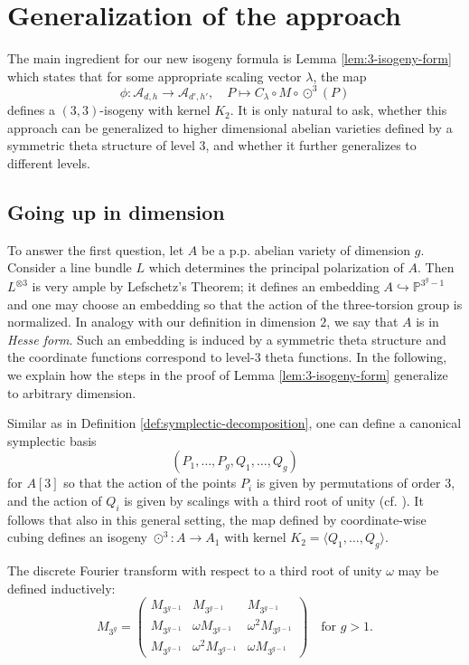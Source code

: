 \documentclass[11pt]{amsart}
\theoremstyle{definition}
\newcommand{\A}{\mathcal{A}}
\newcommand{\PP}{\mathbb{P}}
\newcommand{\cube}{\odot^3}
\begin{document}
\section{Generalization of the approach} \label{sec:generalizations}


The main ingredient for our new isogeny formula is Lemma \ref{lem:3-isogeny-form} which states that for some appropriate scaling vector $\lambda$, the map
\[
\phi: \A_{d,h} \to \A_{d',h'}, \quad P \mapsto C_\lambda \circ M \circ \cube(P)
\] 
defines a $(3,3)$-isogeny with kernel $K_2$. It is only natural to ask, whether this approach can be generalized to higher dimensional abelian varieties defined by a symmetric theta structure of level $3$, and whether it further generalizes to different levels.

\subsection{Going up in dimension}
To answer the first question, let $A$ be a p.p. abelian variety of dimension $g$. Consider a line bundle $L$ which determines the principal polarization of $A$. Then $L^{\otimes 3}$ is very ample by Lefschetz's Theorem; it defines an embedding $A \hookrightarrow \PP^{3^g-1}$ and one may choose an embedding so that the action of the three-torsion group is normalized. In analogy with our definition in dimension $2$, we say that $A$ is in {\em Hesse form}. Such an embedding is induced by a symmetric theta structure and the coordinate functions correspond to level-$3$ theta functions. In the following, we explain how the steps in the proof of Lemma \ref{lem:3-isogeny-form} generalize to arbitrary dimension. 

Similar as in Definition \ref{def:symplectic-decomposition}, one can define a canonical symplectic basis
\[
(P_1, \dots, P_g, Q_1,\dots, Q_g) 
\]
for $A[3]$ so that the action of the points $P_i$ is given by permutations of order $3$, and the action of $Q_i$ is given by scalings with a third root of unity (cf. \cite{mumford1966equations}). It follows that also in this general setting, the map defined by coordinate-wise cubing defines an isogeny $\cube:A \to A_1$ with kernel $K_2 = \langle Q_1, \dots, Q_g\rangle$. 

The discrete Fourier transform with respect to a third root of unity $\omega$ may be defined inductively:
\[
M_{3^g} =  \begin{pmatrix}
		M_{3^{g-1}} & M_{3^{g-1}} & M_{3^{g-1}}\\
		M_{3^{g-1}} & \omega M_{{3^{g-1}}} & \omega^2 M_{3^{g-1}}\\
		M_{3^{g-1}} & \omega^2M_{3^{g-1}} & \omega M_{3^{g-1}}
	\end{pmatrix} \quad \text{for } g>1.
\]
\end{document}
